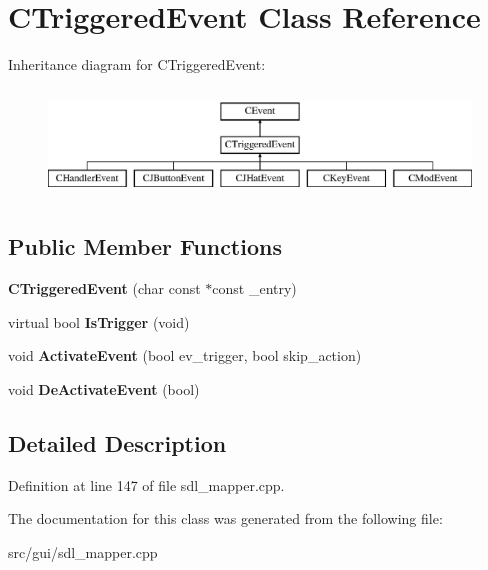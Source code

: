 \hypertarget{classCTriggeredEvent}{\section{C\-Triggered\-Event Class Reference}
\label{classCTriggeredEvent}
}
Inheritance diagram for C\-Triggered\-Event\-:\begin{figure}[H]
\begin{center}
\leavevmode
\includegraphics[height=2.896552cm]{classCTriggeredEvent}
\end{center}
\end{figure}
\subsection*{Public Member Functions}
\begin{DoxyCompactItemize}
\item 
\hypertarget{classCTriggeredEvent_ac9f3fc82121e3632950dfd89e37fc90d}{{\bfseries C\-Triggered\-Event} (char const $\ast$const \-\_\-entry)}\label{classCTriggeredEvent_ac9f3fc82121e3632950dfd89e37fc90d}

\item 
\hypertarget{classCTriggeredEvent_a4ab6cb9bc929db0b4281218ff1205cb6}{virtual bool {\bfseries Is\-Trigger} (void)}\label{classCTriggeredEvent_a4ab6cb9bc929db0b4281218ff1205cb6}

\item 
\hypertarget{classCTriggeredEvent_ab438d4c740739216ae049088f887e6bb}{void {\bfseries Activate\-Event} (bool ev\-\_\-trigger, bool skip\-\_\-action)}\label{classCTriggeredEvent_ab438d4c740739216ae049088f887e6bb}

\item 
\hypertarget{classCTriggeredEvent_a14ad33e00067cce7d4a9266888e24192}{void {\bfseries De\-Activate\-Event} (bool)}\label{classCTriggeredEvent_a14ad33e00067cce7d4a9266888e24192}

\end{DoxyCompactItemize}


\subsection{Detailed Description}


Definition at line 147 of file sdl\-\_\-mapper.\-cpp.



The documentation for this class was generated from the following file\-:\begin{DoxyCompactItemize}
\item 
src/gui/sdl\-\_\-mapper.\-cpp\end{DoxyCompactItemize}
